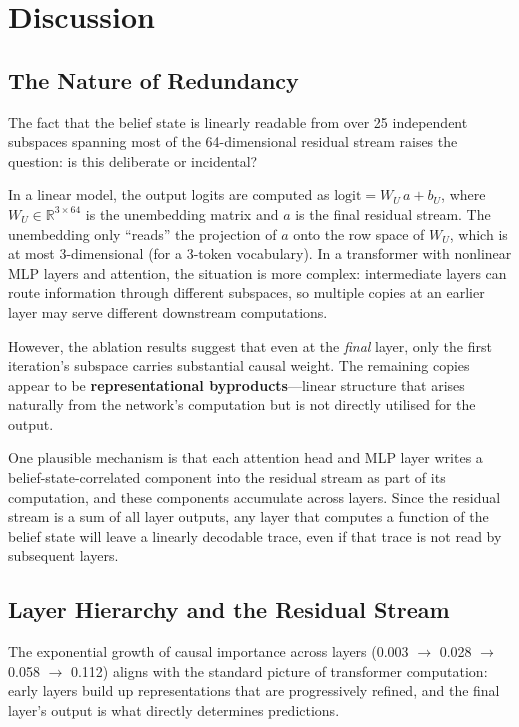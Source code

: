 \documentclass[11pt]{article}
\begin{document}
\section{Discussion}
\label{sec:discussion}

\subsection{The Nature of Redundancy}

The fact that the belief state is linearly readable from over 25 independent subspaces spanning most of the 64-dimensional residual stream raises the question: is this deliberate or incidental?

In a linear model, the output logits are computed as $\text{logit} = W_U \, a + b_U$, where $W_U \in \mathbb{R}^{3 \times 64}$ is the unembedding matrix and $a$ is the final residual stream.  The unembedding only ``reads'' the projection of $a$ onto the row space of $W_U$, which is at most 3-dimensional (for a 3-token vocabulary).  In a transformer with nonlinear MLP layers and attention, the situation is more complex: intermediate layers can route information through different subspaces, so multiple copies at an earlier layer may serve different downstream computations.

However, the ablation results suggest that even at the \emph{final} layer, only the first iteration's subspace carries substantial causal weight.  The remaining copies appear to be \textbf{representational byproducts}---linear structure that arises naturally from the network's computation but is not directly utilised for the output.

One plausible mechanism is that each attention head and MLP layer writes a belief-state-correlated component into the residual stream as part of its computation, and these components accumulate across layers.  Since the residual stream is a sum of all layer outputs, any layer that computes a function of the belief state will leave a linearly decodable trace, even if that trace is not read by subsequent layers.

\subsection{Layer Hierarchy and the Residual Stream}

The exponential growth of causal importance across layers (0.003 $\to$ 0.028 $\to$ 0.058 $\to$ 0.112) aligns with the standard picture of transformer computation: early layers build up representations that are progressively refined, and the final layer's output is what directly determines predictions.
\end{document}
